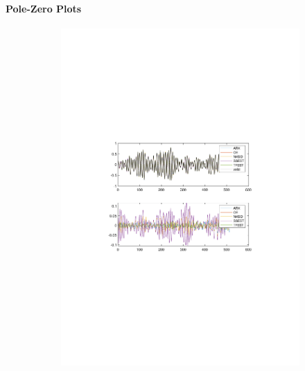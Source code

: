 \documentclass[]{article}
\begin{document}
\paragraph{Pole-Zero Plots}
\begin{figure}[ht]
\centering
\begin{subfigure}{.49\textwidth}
	\centering
	\includegraphics[trim= 10cm 8cm 10cm 8cm, scale=0.4]{figures/simulations.pdf}
\end{subfigure}
\begin{subfigure}{.49\textwidth}
	\centering

\end{subfigure}
\end{figure}
\end{document}
